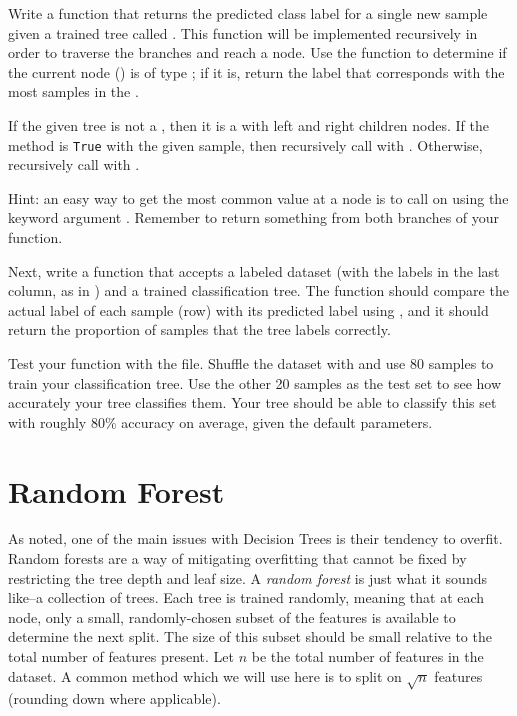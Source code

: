 \begin{problem}
Write a function  that returns the predicted class label for a single new sample given a trained tree called .
This function will be implemented recursively in order to traverse the branches and reach a  node.
Use the  function to determine if the current node () is of type ; if it is, return the label that corresponds with the most samples in the .

If the given tree is not a , then it is a  with left and right children nodes.
If the  method is \texttt{True} with the given sample, then recursively call  with .
Otherwise, recursively call  with .

\noindent Hint: an easy way to get the most common value at a  node is to call  on  using the keyword argument .
Remember to return something from both branches of your function.

Next, write a function  that accepts a labeled dataset (with the labels in the last column, as in ) and a trained classification tree.
The function should compare the actual label of each sample (row) with its predicted label using , and it should return the proportion of samples that the tree labels correctly.

Test your function with the  file.
Shuffle the dataset with  and use 80 samples to train your classification tree.
Use the other 20 samples as the test set to see how accurately your tree classifies them.
Your tree should be able to classify this set with roughly 80\% accuracy on average, given the default parameters.
\end{problem}

\section*{Random Forest} %
As noted, one of the main issues with Decision Trees is their tendency to overfit.
Random forests are a way of mitigating overfitting that cannot be fixed by restricting the tree depth and leaf size.
A \emph{random forest} is just what it sounds like--a collection of trees.
Each tree is trained randomly, meaning that at each node, only a small, randomly-chosen subset of the features is available to determine the next split.
The size of this subset should be small relative to the total number of features present.
Let $n$ be the total number of features in the dataset.
A common method which we will use here is to split on $\sqrt{n}$ features (rounding down where applicable).


